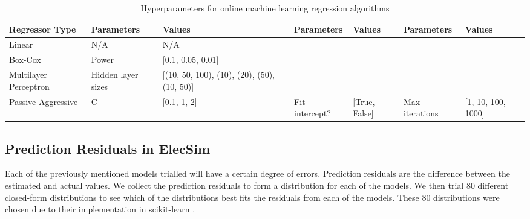 \begin{table}

\qquad
\qquad
\qquad
\qquad
\qquad
\qquad
\qquad
\qquad
\qquad

\centering
\begin{tabular}{@{}llp{2.5cm}lllp{1.6cm}@{}}
\toprule
\textbf{Regressor Type} & \textbf{Parameters} & \textbf{Values}                                  & \textbf{Parameters} & \textbf{Values}   & \textbf{Parameters} & \textbf{Values}        \\ \midrule
Linear                  & N/A                 & N/A                                              &                     &                   &                     &                        \\
Box-Cox                 & Power               & {[}0.1, 0.05, 0.01{]}                            &                     &                   &                     &                        \\
Multilayer Perceptron   & Hidden layer sizes  & {[}(10, 50, 100), (10),  (20), (50), (10, 50){]} & 
                    &                   &                     &                        \\ 
                    Passive Aggressive      & C                   & {[}0.1, 1, 2{]}                                  & Fit intercept?      & {[}True, False{]} & Max iterations      & {[}1, 10, 100, 1000{]} \\
\bottomrule
\end{tabular}%
\caption{Hyperparameters for online machine learning regression algorithms}
\label{table:hyperparameter-tuning-online}
\end{table}%


\subsection{Prediction Residuals in ElecSim}

Each of the previously mentioned models trialled will have a certain degree of errors. Prediction residuals are the difference between the estimated and actual values. We collect the prediction residuals to form a distribution for each of the models. We then trial 80 different closed-form distributions to see which of the distributions best fits the residuals from each of the models. These 80 distributions were chosen due to their implementation in scikit-learn \cite{scikit-learn}.

